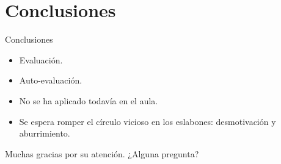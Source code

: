 \documentclass[10pt,notes,compress,usetitleprogressbar,aspectratio=1610]{beamer}
\begin{document}
\section{Conclusiones}

\begin{frame}{Conclusiones}
	\begin{itemize}
		\item<1-> Evaluación.
		\item<2-> Auto-evaluación.
		\item<3-> No se ha aplicado todavía en el aula.
		\item<4-> Se espera romper el círculo vicioso en los eslabones: desmotivación y aburrimiento.
	\end{itemize}
\end{frame}



\begin{frame}[standout]
\begin{center}
Muchas gracias por su atención. ¿Alguna pregunta?
\end{center}

\end{frame}


\end{document}
